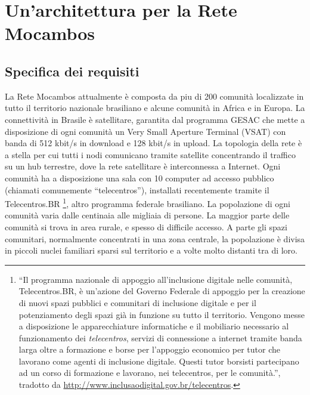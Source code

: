
\chapter{Un'architettura per la Rete Mocambos} %
\label{Capitolo3}

\section{Specifica dei requisiti}
La Rete Mocambos attualmente è composta da piu di 200 comunità
localizzate in tutto il territorio nazionale brasiliano e alcune
comunità in Africa e in Europa. La connettività in Brasile è
satellitare, garantita dal programma GESAC che mette a disposizione di ogni
comunità un Very Small Aperture Terminal (VSAT) con banda di 512
kbit/s in download e 128 kbit/s in upload. La topologia della rete è a
stella per cui tutti i nodi comunicano tramite satellite concentrando
il traffico su un hub terrestre, dove la rete satellitare è
interconnessa a Internet. Ogni comunità ha a disposizione una sala con
10 computer ad accesso pubblico (chiamati comunemente
``telecentros''), installati recentemente tramite il Telecentros.BR
\footnote{``Il programma nazionale di appoggio all'inclusione digitale
  nelle comunità, Telecentros.BR, è un'azione del Governo Federale di
  appoggio per la creazione di nuovi spazi pubblici e comunitari di
  inclusione digitale e per il potenziamento degli spazi già in
  funzione su tutto il territorio. Vengono messe a disposizione le
  apparecchiature informatiche e il mobiliario necessario al
  funzionamento dei \textit{telecentros}, servizi di connessione a
  internet tramite banda larga oltre a formazione e borse per
  l'appoggio economico per tutor che lavorano come agenti di
  inclusione digitale. Questi tutor borsisti partecipano ad un corso
  di formazione e lavorano, nei telecentros, per le comunità.'',
  tradotto da \url{http://www.inclusaodigital.gov.br/telecentros}.}, altro
programma federale brasiliano. La popolazione di ogni comunità varia
dalle centinaia alle migliaia di persone. La maggior parte delle
comunità si trova in area rurale, e spesso di difficile accesso. A
parte gli spazi comunitari, normalmente concentrati in una zona
centrale, la popolazione è divisa in piccoli nuclei familiari sparsi
sul territorio e a volte molto distanti tra di loro. 

